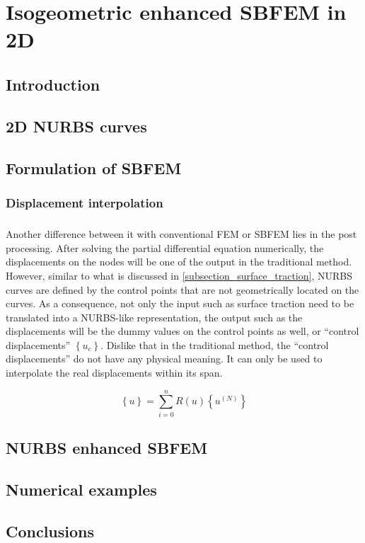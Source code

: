 
\chapter{Isogeometric enhanced SBFEM in 2D}
\section{Introduction}
\paragraph{}

\section{2D NURBS curves}
    



\section{Formulation of SBFEM}
    \subsection{Displacement interpolation}
    \paragraph{}
    Another difference between it with conventional FEM or SBFEM lies in the post processing.
    After solving the partial differential equation numerically, the displacements on the nodes will be one of the output in
        the traditional method.
    However, similar to what is discussed in \ref{subsection_surface_traction}, NURBS curves are defined by the control points
        that are not geometrically located on the curves.
    As a consequence, not only the input such as surface traction need to be translated into a NURBS-like representation, the
        output such as the displacements will be the dummy values on the control points as well, or ``control displacements''
        $\left\{ u_c \right\}$.
    Dislike that in the traditional method, the ``control displacements'' do not have any physical meaning. It can only be used
        to interpolate the real displacements within its span.

    \begin{equation}
        \left\{ u \right\}=
        \sum_{i=0}^n
        R(u) \left\{u^{(N)}\right\}
    \label{eq:displacement_interpolation}
    \end{equation}
    \pagebreak


\section{NURBS enhanced SBFEM}

\section{Numerical examples}

\section{Conclusions}